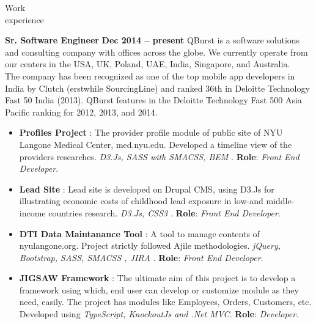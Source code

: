 \documentclass{resume}
\begin{document}
\begin{category}{Work \\experience}
  
  \citemnobullet \textbf{Sr. Software Engineer} \hfill \textbf{Dec 2014 -- present}
  \citemnobullet QBurst is a software solutions and consulting company with offices across the globe.
We currently operate from our centers in the USA, UK, Poland, UAE, India, Singapore, and Australia. \\The company has been recognized as one of the top mobile app developers in India by Clutch (erstwhile SourcingLine) and ranked 36th in Deloitte Technology Fast 50 India (2013). QBurst features in the Deloitte Technology Fast 500 Asia Pacific ranking for 2012, 2013, and 2014.
  \begin{itemize}
  \item \textbf{Profiles Project} : The provider profile module of public site of NYU Langone Medical Center, med.nyu.edu. Developed a timeline view of the providers researches. {\em D3.Js, SASS with SMACSS, BEM }. \textbf{Role}: {\em Front End Developer}. 
  \item \textbf{Lead Site} : Lead site is developed on Drupal CMS, using D3.Js for illustrating economic costs of childhood lead exposure in low-and middle-income countries research. {\em D3.Js, CSS3 }. \textbf{Role}: {\em Front End Developer}. 
  \item \textbf{DTI Data Maintanance Tool} : A tool to manage contents of nyulangone.org. Project strictly followed Ajile methodologies. {\em jQuery, Bootstrap, SASS, SMACSS , JIRA }. \textbf{Role}: {\em Front End Developer}. 
  \item \textbf{JIGSAW Framework} : The ultimate aim of this project is to develop a framework using which, end user can develop  or customize module as they need, easily. The project has modules like Employees, Orders, Customers, etc. Developed using {\em TypeScript, KnockoutJs and .Net MVC}. \textbf{Role}: {\em Developer}.
  \end{itemize}


\end{category}
\end{document}
